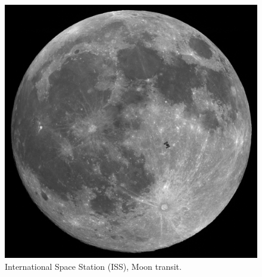 \documentclass[sts]{article}
\begin{document}
\begin{figure}[h]
\includegraphics[scale=0.1,angle=45]{ISS_moon.jpg}
\caption{International Space Station (ISS), Moon transit.}
\label{fig:moon}
\end{figure}
\end{document}
